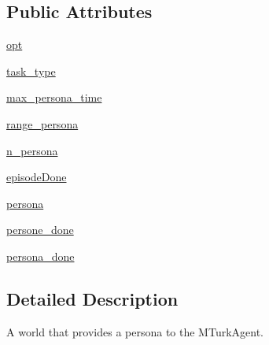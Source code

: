 \subsection*{Public Attributes}
\begin{DoxyCompactItemize}
\item 
\hyperlink{classparlai_1_1mturk_1_1tasks_1_1personachat_1_1personachat__collect__personas_1_1worlds_1_1PersonaProfileWorld_aacd506fe7f9a62c37a109a8896e6ddca}{opt}
\item 
\hyperlink{classparlai_1_1mturk_1_1tasks_1_1personachat_1_1personachat__collect__personas_1_1worlds_1_1PersonaProfileWorld_a5d3fcb3260cb4234fead9654ab40f150}{task\+\_\+type}
\item 
\hyperlink{classparlai_1_1mturk_1_1tasks_1_1personachat_1_1personachat__collect__personas_1_1worlds_1_1PersonaProfileWorld_a5f66f5e14283cfc9109a2619b77f2db8}{max\+\_\+persona\+\_\+time}
\item 
\hyperlink{classparlai_1_1mturk_1_1tasks_1_1personachat_1_1personachat__collect__personas_1_1worlds_1_1PersonaProfileWorld_a07ffad4bebade8273b53f84c6bd22ccf}{range\+\_\+persona}
\item 
\hyperlink{classparlai_1_1mturk_1_1tasks_1_1personachat_1_1personachat__collect__personas_1_1worlds_1_1PersonaProfileWorld_ac84651f7191a3795d1b38ec079990e97}{n\+\_\+persona}
\item 
\hyperlink{classparlai_1_1mturk_1_1tasks_1_1personachat_1_1personachat__collect__personas_1_1worlds_1_1PersonaProfileWorld_a37e013e79d7dc8663813dc45340ea9a0}{episode\+Done}
\item 
\hyperlink{classparlai_1_1mturk_1_1tasks_1_1personachat_1_1personachat__collect__personas_1_1worlds_1_1PersonaProfileWorld_a72c1b807bd5675177bd2bbaaee26ca1f}{persona}
\item 
\hyperlink{classparlai_1_1mturk_1_1tasks_1_1personachat_1_1personachat__collect__personas_1_1worlds_1_1PersonaProfileWorld_a0182ad14116156b32f38ae4f4d3dff29}{persone\+\_\+done}
\item 
\hyperlink{classparlai_1_1mturk_1_1tasks_1_1personachat_1_1personachat__collect__personas_1_1worlds_1_1PersonaProfileWorld_a64146427708eb1b226fea0da11ab21e7}{persona\+\_\+done}
\end{DoxyCompactItemize}


\subsection{Detailed Description}
\begin{DoxyVerb}A world that provides a persona to the MTurkAgent.
\end{DoxyVerb}
 

